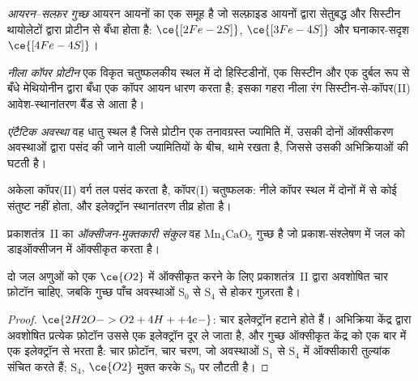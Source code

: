 \begin{definition}[आयरन--सल्फ़र गुच्छ]\label{def:b3:bioinorganic:fes}
\emph{आयरन--सल्फ़र गुच्छ} आयरन
आयनों का एक समूह है जो सल्फ़ाइड आयनों द्वारा सेतुबद्ध और सिस्टीन थायोलेटों द्वारा प्रोटीन से बँधा होता है:
$\ce{[2Fe-2S]}$, $\ce{[3Fe-4S]}$ और घनाकार-सदृश $\ce{[4Fe-4S]}$।
\end{definition}

\begin{definition}[नीले कॉपर प्रोटीन]\label{def:b3:bioinorganic:blue-copper}
\emph{नीला कॉपर प्रोटीन} एक विकृत चतुष्फलकीय स्थल में
दो हिस्टिडीनों, एक सिस्टीन और एक दुर्बल रूप से बँधे मेथियोनीन द्वारा बँधा एक कॉपर
आयन धारण करता है; इसका गहरा नीला रंग
सिस्टीन-से-कॉपर(II) आवेश-स्थानांतरण बैंड से आता है।
\end{definition}

\begin{definition}[एंटैटिक अवस्था]\label{def:b3:bioinorganic:entatic}
\emph{एंटैटिक अवस्था} वह धातु स्थल है जिसे
प्रोटीन एक तनावग्रस्त ज्यामिति में, उसकी दोनों ऑक्सीकरण अवस्थाओं द्वारा पसंद की जाने वाली
ज्यामितियों के बीच, थामे रखता है, जिससे उसकी अभिक्रियाओं की  घटती है।
\end{definition}

अकेला कॉपर(II) वर्ग तल पसंद करता है, कॉपर(I) चतुष्फलक: नीले
कॉपर स्थल में दोनों में से कोई संतुष्ट नहीं होता, और इलेक्ट्रॉन स्थानांतरण तीव्र होता है।

\begin{definition}[ऑक्सीजन-मुक्तकारी संकुल]\label{def:b3:bioinorganic:oec}
प्रकाशतंत्र~II का \emph{ऑक्सीजन-मुक्तकारी संकुल}
वह $\mathrm{Mn_4CaO_5}$ गुच्छ है जो प्रकाश-संश्लेषण में जल को डाइऑक्सीजन में
ऑक्सीकृत करता है।
\end{definition}

\begin{proposition}[प्रति ऑक्सीजन चार फ़ोटॉन]\label{prop:b3:bioinorganic:kok}
दो जल अणुओं को एक $\ce{O2}$ में ऑक्सीकृत करने के लिए प्रकाशतंत्र~II द्वारा
अवशोषित चार फ़ोटॉन चाहिए, जबकि गुच्छ पाँच अवस्थाओं $\mathrm S_0$ से $\mathrm S_4$ से होकर गुज़रता है।
\end{proposition}

\begin{proof}
$\ce{2H2O -> O2 + 4H+ + 4e-}$: चार इलेक्ट्रॉन हटाने होते हैं। अभिक्रिया केंद्र द्वारा अवशोषित प्रत्येक फ़ोटॉन
उससे एक इलेक्ट्रॉन दूर ले जाता है, और गुच्छ ऑक्सीकृत केंद्र को
एक बार में एक इलेक्ट्रॉन से भरता है: चार फ़ोटॉन, चार चरण, जो
अवस्थाओं $\mathrm S_1$ से $\mathrm S_4$ में ऑक्सीकारी तुल्यांक संचित करते हैं; $\mathrm S_4$, $\ce{O2}$ मुक्त करके $\mathrm S_0$ पर लौटती है।
\end{proof}


